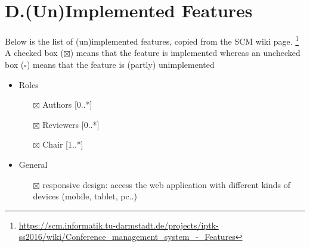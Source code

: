 \documentclass[nochapterpage,nopartpage,noheadingspace,numbersubsubsec,bigchapter,colorback,accentcolor=tud9c,10pt]{tudreport}
\begin{document}
  \chapter*{D.\quad (Un)Implemented Features}

    Below is the list of (un)implemented features, copied from the SCM wiki page.%
    \footnote{\url{https://scm.informatik.tu-darmstadt.de/projects/iptk-ss2016/wiki/Conference_management_system_-_Features}}
    A checked box ($\boxtimes$) means that the feature is implemented whereas an unchecked box ($\square$) means that the feature is (partly) unimplemented
        \begin{itemize}
            \setlength\itemsep{0em}
            \item Roles
            \begin{itemize}
                \item[$\boxtimes$] Authors [0..*]
                \item[$\boxtimes$] Reviewers [0..*]
                \item[$\boxtimes$] Chair [1..*]
            \end{itemize}

            \item General
            \begin{itemize}
                \item[$\boxtimes$] responsive design: access the web application with different kinds of devices (mobile, tablet, pc..)
            \end{itemize}


\end{itemize}
\end{document}

